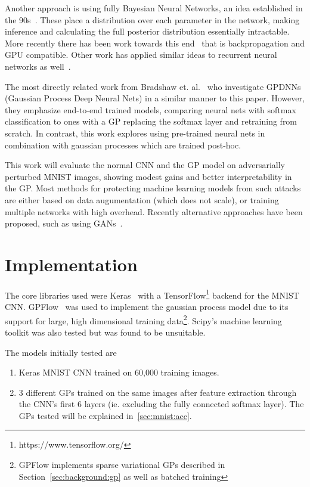 \documentclass{article}
\begin{document}
Another approach is using fully Bayesian Neural Networks, an idea established in the 90s~\cite{mackay1992practical}. These place a distribution over each parameter in the network, making inference and calculating the full posterior distribution essentially intractable. More recently there has been work towards this end~\cite{blundell2015weight} that is backpropagation and GPU compatible. Other work has applied similar ideas to recurrent neural networks as well~\cite{zhu2017deep}.

The most directly related work from Bradshaw et. al.~\cite{Bradshaw2017} who investigate GPDNNs (Gaussian Process Deep Neural Nets) in a similar manner to this paper. However, they emphasize end-to-end trained models, comparing neural nets with softmax classification to ones with a GP replacing the softmax layer and retraining from scratch. In contrast, this work explores using pre-trained neural nets in combination with gaussian processes which are trained post-hoc.

This work will evaluate the normal CNN and the GP model on adversarially perturbed MNIST images, showing modest gains and better interpretability in the GP. Most methods for protecting machine learning models from such attacks are either based on data augumentation (which does not scale), or training multiple networks with high overhead. Recently alternative approaches have been proposed, such as using GANs~\cite{samangouei2018defense}\cite{zantedeschi2017efficient}.


 
\section{Implementation}

The core libraries used were Keras~\cite{chollet2015keras} with a TensorFlow\footnote{https://www.tensorflow.org/} backend for the MNIST CNN. GPFlow~\cite{GPflow2017} was used to implement the gaussian process model due to its support for large, high dimensional training data\footnote{GPFlow implements sparse variational GPs described in Section~\ref{sec:background:gp} as well as batched training}. Scipy's machine learning toolkit was also tested but was found to be unsuitable.

The models initially tested are
\begin{enumerate}
\item Keras MNIST CNN trained on 60,000 training images.
\item 3 different GPs trained on the same images after feature extraction through the CNN's first 6 layers (ie. excluding the fully connected softmax layer). The GPs tested will be explained in~\ref{sec:mnist:acc}.
\end{enumerate} 
\end{document}
